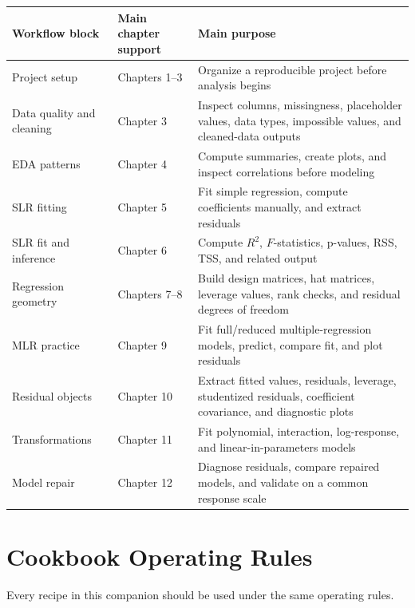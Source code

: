 \begin{center}
\begin{tabular}{p{}p{}p{}}
\hline
Workflow block & Main chapter support & Main purpose \\
\hline
Project setup & Chapters 1--3 & Organize a reproducible project before analysis begins \\
Data quality and cleaning & Chapter 3 & Inspect columns, missingness, placeholder values, data types, impossible values, and cleaned-data outputs \\
EDA patterns & Chapter 4 & Compute summaries, create plots, and inspect correlations before modeling \\
SLR fitting & Chapter 5 & Fit simple regression, compute coefficients manually, and extract residuals \\
SLR fit and inference & Chapter 6 & Compute \(R^2\), \(F\)-statistics, p-values, RSS, TSS, and related output \\
Regression geometry & Chapters 7--8 & Build design matrices, hat matrices, leverage values, rank checks, and residual degrees of freedom \\
MLR practice & Chapter 9 & Fit full/reduced multiple-regression models, predict, compare fit, and plot residuals \\
Residual objects & Chapter 10 & Extract fitted values, residuals, leverage, studentized residuals, coefficient covariance, and diagnostic plots \\
Transformations & Chapter 11 & Fit polynomial, interaction, log-response, and linear-in-parameters models \\
Model repair & Chapter 12 & Diagnose residuals, compare repaired models, and validate on a common response scale \\
\hline
\end{tabular}
\end{center}

\section{Cookbook Operating Rules}
\label{app:cookbook-operating-rules}

Every recipe in this companion should be used under the same operating rules.

